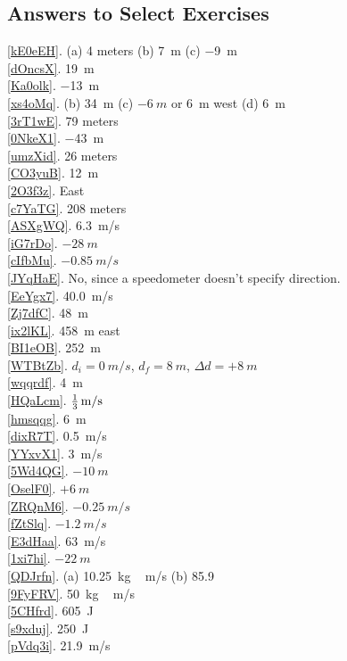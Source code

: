 \documentclass[../main.tex]{subfiles}
\begin{document}
\clearpage
\subsection{Answers to Select Exercises}

\ref{kE0eEH}. (a) 4 meters \hspace{1em} (b) \SI{+7}{m} \hspace{1em} (c) \SI{-9}{m}\\
\ref{dOncsX}. \SI{19}{m}\\
\ref{Ka0olk}. \SI{-13}{m}\\
\ref{xs4oMq}. (b) \SI{34}{m} \hspace{2em} (c) $-\SI{6}{m}$ or \SI{6}{m} west \hspace{2em} (d) \SI{6}{m}\\ 
\ref{3rT1wE}. 79 meters\\
\ref{0NkeX1}. \SI{-43}{m}\\
\ref{umzXid}. 26 meters\\
\ref{CO3yuB}. \SI{12}{m}\\
\ref{2O3f3z}. East\\
\ref{c7YaTG}. 208 meters\\
\ref{ASXgWQ}. \SI{6.3}{m/s}\\
\ref{iG7rDo}. $-\SI{28}{m}$\\
\ref{cIfbMu}. $-\SI{0.85}{m/s}$\\
\ref{JYqHaE}. No, since a speedometer doesn't specify direction.\\
\ref{EeYgx7}. \SI{40.0}{m/s}\\
\ref{Zj7dfC}. \SI{48}{m}\\
\ref{ix2lKL}. \SI{458}{m} east\\
\ref{BI1eOB}. \SI{252}{m}\\
\ref{WTBtZb}. $d_i=\SI{0}{m/s}$, $d_f=\SI{8}{m}$, $\Delta{d} = +\SI{8}{m}$\\
\ref{wqqrdf}. \SI{4}{m}\\
\ref{HQaLcm}. $\SI[parse-numbers = false]{\frac{1}{3}}{m/s}$\\
\ref{hmsqqg}. \SI{6}{m}\\
\ref{dixR7T}. \SI{0.5}{m/s}\\
\ref{YYxvX1}. \SI{3}{m/s}\\
\ref{5Wd4QG}. $-\SI{10}{m}$\\
\ref{OselF0}. $+\SI{6}{m}$\\
\ref{ZRQnM6}. $-\SI{0.25}{m/s}$\\
\ref{fZtSlq}. $-\SI{1.2}{m/s}$\\
\ref{E3dHaa}. \SI{63}{m/s}\\
\ref{1xi7hi}. $-\SI{22}{m}$\\
\ref{QDJrfn}. (a) \SI{10.25}{kg\,m/s} \hspace{1em} (b) 85.9\\
\ref{9FyFRV}. \SI{50}{kg\,m/s}\\
\ref{5CHfrd}. \SI{605}{J}\\
\ref{s9xduj}. \SI{250}{J}\\
\ref{pVdq3i}. \SI{21.9}{m/s}
\end{document}
